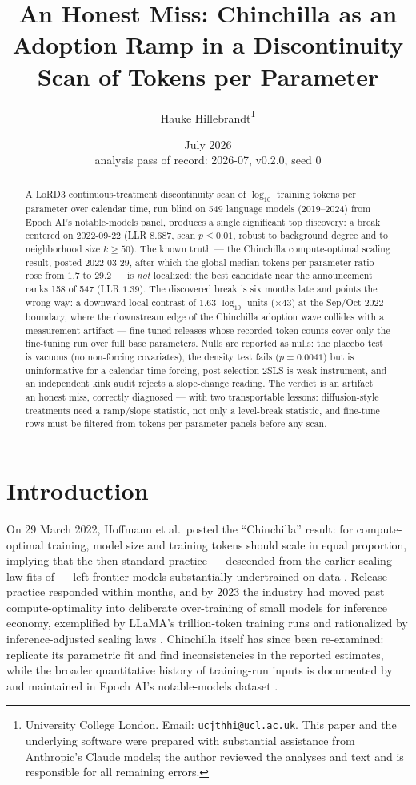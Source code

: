 \documentclass[11pt]{article}
\title{An Honest Miss: Chinchilla as an Adoption Ramp in a Discontinuity Scan
of Tokens per Parameter}
\author{Hauke Hillebrandt\thanks{University College London. Email:
\texttt{ucjthhi@ucl.ac.uk}. This paper and the underlying \natex{} software were
prepared with substantial assistance from Anthropic's Claude models; the author
reviewed the analyses and text and is responsible for all remaining errors.}}
\date{July 2026 \\ \small analysis pass of record: 2026-07, \natex{} v0.2.0, seed 0}
\begin{document}
\maketitle

\begin{abstract}
\noindent A LoRD3 continuous-treatment discontinuity scan of $\log_{10}$
training tokens per parameter over calendar time, run blind on 549 language
models (2019--2024) from Epoch AI's notable-models panel, produces a single
significant top discovery: a break centered on 2022-09-22 (LLR $8.687$, scan
$p \leq 0.01$, robust to background degree and to neighborhood size
$k \geq 50$). The known truth --- the Chinchilla compute-optimal scaling
result, posted 2022-03-29, after which the global median tokens-per-parameter
ratio rose from $1.7$ to $29.2$ --- is \emph{not} localized: the best
candidate near the announcement ranks 158 of 547 (LLR $1.39$). The discovered
break is six months late and points the wrong way: a downward local contrast
of $1.63$ $\log_{10}$ units ($\times 43$) at the Sep/Oct 2022 boundary, where
the downstream edge of the Chinchilla adoption wave collides with a
measurement artifact --- fine-tuned releases whose recorded token counts
cover only the fine-tuning run over full base parameters. Nulls are reported
as nulls: the placebo test is vacuous (no non-forcing covariates), the
density test fails ($p=0.0041$) but is uninformative for a calendar-time
forcing, post-selection 2SLS is weak-instrument, and an independent kink
audit rejects a slope-change reading. The verdict is an artifact --- an
honest miss,
correctly diagnosed --- with two transportable lessons: diffusion-style
treatments need a ramp/slope statistic, not only a level-break statistic, and
fine-tune rows must be filtered from tokens-per-parameter panels before any
scan.
\end{abstract}

\section{Introduction}\label{sec:intro}

On 29 March 2022, Hoffmann et al.\ posted the ``Chinchilla'' result: for
compute-optimal training, model size and training tokens should scale in
equal proportion, implying that the then-standard practice --- descended from
the earlier scaling-law fits of \cite{kaplan2020} --- left frontier models
substantially undertrained on data \cite{hoffmann2022}. Release practice
responded within months, and by 2023 the industry had moved past
compute-optimality into deliberate over-training of small models for
inference economy, exemplified by LLaMA's trillion-token training runs
\cite{touvron2023} and rationalized by inference-adjusted scaling laws
\cite{sardana2024}.
Chinchilla itself has since been re-examined: \cite{besiroglu2024} replicate
its parametric fit and find inconsistencies in the reported estimates, while
the broader quantitative history of training-run inputs is documented by
\cite{sevilla2022} and maintained in Epoch AI's notable-models dataset
\cite{epoch2024}.
\end{document}
